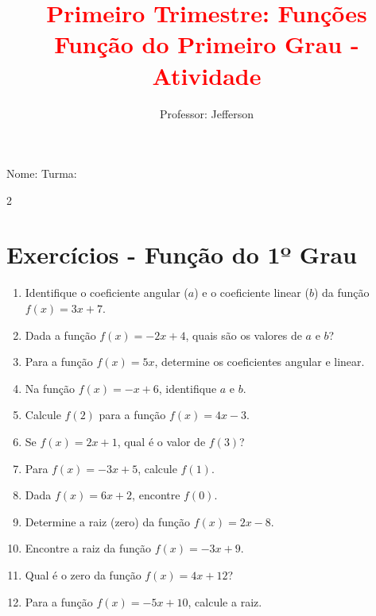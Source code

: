 \documentclass[11pt]{article}
\title{\textcolor{red}{Primeiro Trimestre: Funções
    \\Função do Primeiro Grau - Atividade}}
\author{Professor: Jefferson}
\date{}
\begin{document}
\maketitle
\vspace{-1cm}

\begin{center}
\large{Nome: \underline{\hspace{8cm}} \quad Turma: \underline{\hspace{3cm}}}
\end{center}

\begin{multicols}{2}

\section*{Exercícios - Função do 1º Grau}

\begin{enumerate}[leftmargin=*]

\item Identifique o coeficiente angular ($a$) e o coeficiente linear ($b$) da função $f(x) = 3x + 7$.

\item Dada a função $f(x) = -2x + 4$, quais são os valores de $a$ e $b$?

\item Para a função $f(x) = 5x$, determine os coeficientes angular e linear.

\item Na função $f(x) = -x + 6$, identifique $a$ e $b$.

\item Calcule $f(2)$ para a função $f(x) = 4x - 3$.

\item Se $f(x) = 2x + 1$, qual é o valor de $f(3)$?

\item Para $f(x) = -3x + 5$, calcule $f(1)$.

\item Dada $f(x) = 6x + 2$, encontre $f(0)$.

\item Determine a raiz (zero) da função $f(x) = 2x - 8$.

\item Encontre a raiz da função $f(x) = -3x + 9$.

\item Qual é o zero da função $f(x) = 4x + 12$?

\item Para a função $f(x) = -5x + 10$, calcule a raiz.


\end{enumerate}
\end{multicols}
\end{document}
